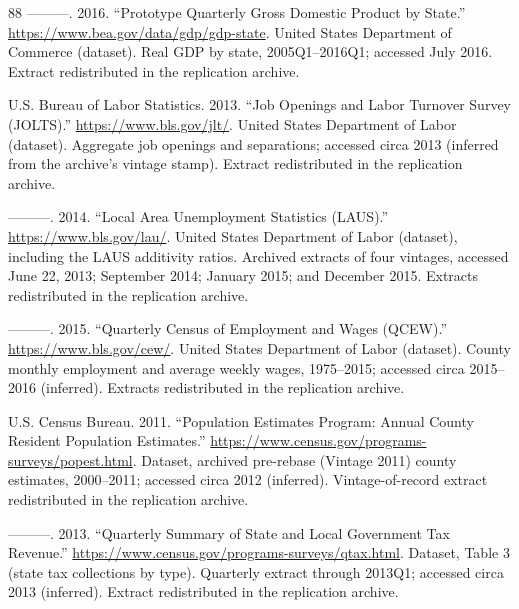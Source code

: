 \documentclass[12pt]{article}
\newcommand{\1}{\mathbf{1}}
\begin{document}
\begin{thebibliography}{88}
---{}---{}---. 2016.
\newblock \enquote{Prototype Quarterly Gross Domestic Product by State.}
\newblock \urlprefix\url{https://www.bea.gov/data/gdp/gdp-state}.
\newblock United States Department of Commerce (dataset). Real {GDP} by state, 2005Q1--2016Q1; accessed July 2016. Extract redistributed in the replication archive.

{U.S. Bureau of Labor Statistics}. 2013.
\newblock \enquote{Job Openings and Labor Turnover Survey ({JOLTS}).}
\newblock \urlprefix\url{https://www.bls.gov/jlt/}.
\newblock United States Department of Labor (dataset). Aggregate job openings and separations; accessed circa 2013 (inferred from the archive's vintage stamp). Extract redistributed in the replication archive.

---{}---{}---. 2014.
\newblock \enquote{Local Area Unemployment Statistics ({LAUS}).}
\newblock \urlprefix\url{https://www.bls.gov/lau/}.
\newblock United States Department of Labor (dataset), including the {LAUS} additivity ratios. Archived extracts of four vintages, accessed June 22, 2013; September 2014; January 2015; and December 2015. Extracts redistributed in the replication archive.

---{}---{}---. 2015.
\newblock \enquote{Quarterly Census of Employment and Wages ({QCEW}).}
\newblock \urlprefix\url{https://www.bls.gov/cew/}.
\newblock United States Department of Labor (dataset). County monthly employment and average weekly wages, 1975--2015; accessed circa 2015--2016 (inferred). Extracts redistributed in the replication archive.

{U.S. Census Bureau}. 2011.
\newblock \enquote{Population Estimates Program: Annual County Resident Population Estimates.}
\newblock \urlprefix\url{https://www.census.gov/programs-surveys/popest.html}.
\newblock Dataset, archived pre-rebase (Vintage 2011) county estimates, 2000--2011; accessed circa 2012 (inferred). Vintage-of-record extract redistributed in the replication archive.

---{}---{}---. 2013.
\newblock \enquote{Quarterly Summary of State and Local Government Tax Revenue.}
\newblock \urlprefix\url{https://www.census.gov/programs-surveys/qtax.html}.
\newblock Dataset, Table 3 (state tax collections by type). Quarterly extract through 2013Q1; accessed circa 2013 (inferred). Extract redistributed in the replication archive.


\end{thebibliography}
\end{document}
